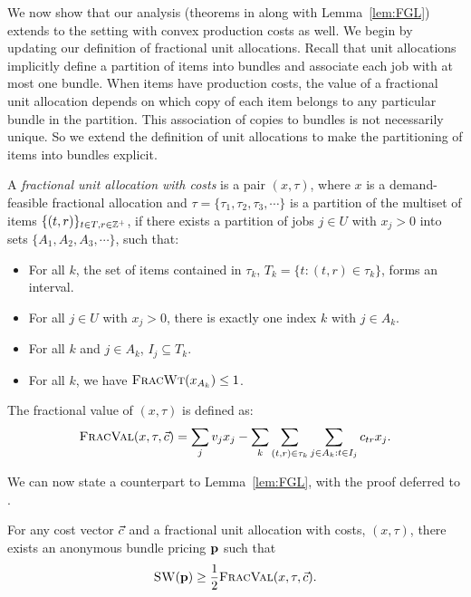 We now show that our analysis (theorems in
 along with Lemma~\ref{lem:FGL}) extends to the
setting with convex production costs as well. We begin by updating our
definition of fractional unit allocations. Recall that unit
allocations implicitly define a partition of items into bundles and
associate each job with at most one bundle. When items have production
costs, the value of a fractional unit allocation depends on which copy
of each item belongs to any particular bundle in the partition. This
association of copies to bundles is not necessarily unique. So we
extend the definition of unit allocations to make the partitioning of
items into bundles explicit. 

\begin{definition} A {\em fractional unit allocation with costs} is a
  pair $(x,\tau)$, where $x$ is a demand-feasible fractional allocation and
  $\tau= \{\tau_1, \tau_2, \tau_3, \cdots\}$ is a partition of the multiset of
  items $\{(t,r)\}_{t\in T, r\in\mathbb{Z}^+}$, if there exists a partition of
  jobs $j\in U$ with $x_j>0$ into sets $\{A_1, A_2, A_3, \cdots\}$,
  such that:
    \begin{itemize}
    \item For all $k$, the set of items contained in $\tau_k$, $T_k=\{t:
      (t,r)\in \tau_k\}$, forms an interval.
        \item For all $j\in U$ with $x_j>0$, there is exactly one
          index $k$ with $j\in A_k$. 
        \item For all $k$ and $j\in A_k$, $I_j\subseteq T_k$.
        \item For all $k$, we have ${\normalfont\textsc{FracWt}}(x_{A_k}) \le 1$.
    \end{itemize}
    The fractional value of $(x,\tau)$ is defined as:
    \[{\normalfont\textsc{FracVal}}(x,\tau,\vec{c}) = \sum_j v_jx_j - \sum_k \sum_{(t,r)\in
        \tau_k}  \sum_{j\in A_k: t\in I_j} c_{tr}x_j.\]
\end{definition}

\noindent
We can now state a counterpart to Lemma~\ref{lem:FGL}, with the proof
deferred to .
\begin{lemma}
    \label{lem:FGL-costs}
    For any cost vector $\vec{c}$ and a fractional unit allocation with
    costs, $(x,\tau)$, there exists an anonymous bundle pricing
    $\mathbf{p}$ such that
    \[
        {\normalfont\textsc{SW}}(\mathbf{p}) \ge \frac12 {\normalfont\textsc{FracVal}}(x,\tau,\vec{c}).
    \]
\end{lemma}

